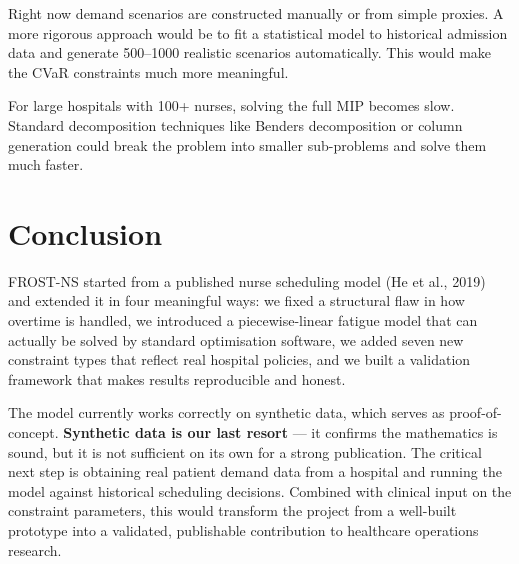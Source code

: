 \documentclass[12pt,a4paper]{article}
\begin{document}
\vspace{6pt}
\begin{solutionbox}
Right now demand scenarios are constructed manually or from simple proxies. A more rigorous approach would be to fit a statistical model to historical admission data and generate 500–1000 realistic scenarios automatically. This would make the CVaR constraints much more meaningful.
\end{solutionbox}

\vspace{6pt}
\begin{solutionbox}
For large hospitals with 100+ nurses, solving the full MIP becomes slow. Standard decomposition techniques like Benders decomposition or column generation could break the problem into smaller sub-problems and solve them much faster.
\end{solutionbox}

\newpage
\section{Conclusion}

FROST-NS started from a published nurse scheduling model (He et al., 2019) and extended it in four meaningful ways: we fixed a structural flaw in how overtime is handled, we introduced a piecewise-linear fatigue model that can actually be solved by standard optimisation software, we added seven new constraint types that reflect real hospital policies, and we built a validation framework that makes results reproducible and honest.

The model currently works correctly on synthetic data, which serves as proof-of-concept. \textbf{Synthetic data is our last resort} — it confirms the mathematics is sound, but it is not sufficient on its own for a strong publication. The critical next step is obtaining real patient demand data from a hospital and running the model against historical scheduling decisions. Combined with clinical input on the constraint parameters, this would transform the project from a well-built prototype into a validated, publishable contribution to healthcare operations research.
\end{document}
